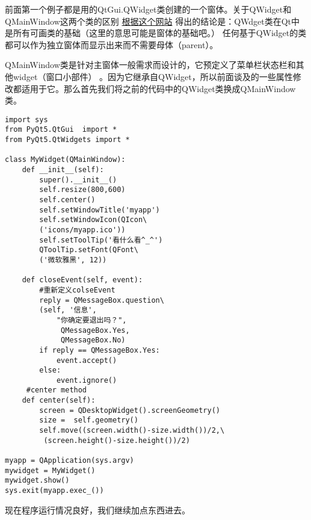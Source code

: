 \documentclass[11pt,oneside]{article}
\begin{document}
前面第一个例子都是用的QtGui.QWidget类创建的一个窗体。关于QWidget和QMainWindow这两个类的区别 \href{http://stackoverflow.com/questions/3298792/whats-the-difference-between-qmainwindow-and-qwidget-and-qdialog}{根据这个网站} 得出的结论是：QWdget类在Qt中是所有可画类的基础（这里的意思可能是窗体的基础吧。） 任何基于QWidget的类都可以作为独立窗体而显示出来而不需要母体（parent）。

QMainWindow类是针对主窗体一般需求而设计的，它预定义了菜单栏状态栏和其他widget（窗口小部件） 。因为它继承自QWidget，所以前面谈及的一些属性修改都适用于它。那么首先我们将之前的代码中的QWidget类换成QMainWindow类。

\begin{verbatim}
import sys
from PyQt5.QtGui  import *
from PyQt5.QtWidgets import *

class MyWidget(QMainWindow):
    def __init__(self):
        super().__init__()
        self.resize(800,600)
        self.center()
        self.setWindowTitle('myapp')
        self.setWindowIcon(QIcon\
        ('icons/myapp.ico'))
        self.setToolTip('看什么看^_^')
        QToolTip.setFont(QFont\
        ('微软雅黑', 12))

    def closeEvent(self, event):
        #重新定义colseEvent
        reply = QMessageBox.question\
        (self, '信息',
            "你确定要退出吗？",
             QMessageBox.Yes,
             QMessageBox.No)
        if reply == QMessageBox.Yes:
            event.accept()
        else:
            event.ignore()
     #center method
    def center(self):
        screen = QDesktopWidget().screenGeometry()
        size =  self.geometry()
        self.move((screen.width()-size.width())/2,\
         (screen.height()-size.height())/2)

myapp = QApplication(sys.argv)
mywidget = MyWidget()
mywidget.show()
sys.exit(myapp.exec_())
\end{verbatim}

现在程序运行情况良好，我们继续加点东西进去。
\end{document}
